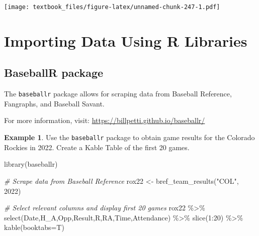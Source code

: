 \documentclass[
  11pt,
]{book}
\newenvironment{Shaded}{\begin{snugshade}}{\end{snugshade}}
\newcommand{\AttributeTok}[1]{\textcolor[rgb]{0.77,0.63,0.00}{#1}}
\newcommand{\CommentTok}[1]{\textcolor[rgb]{0.56,0.35,0.01}{\textit{#1}}}
\newcommand{\DecValTok}[1]{\textcolor[rgb]{0.00,0.00,0.81}{#1}}
\newcommand{\FunctionTok}[1]{\textcolor[rgb]{0.00,0.00,0.00}{#1}}
\newcommand{\NormalTok}[1]{#1}
\newcommand{\OtherTok}[1]{\textcolor[rgb]{0.56,0.35,0.01}{#1}}
\newcommand{\SpecialCharTok}[1]{\textcolor[rgb]{0.00,0.00,0.00}{#1}}
\newcommand{\StringTok}[1]{\textcolor[rgb]{0.31,0.60,0.02}{#1}}
\theoremstyle{definition}
\theoremstyle{definition}
\newtheorem{example}{Example}[chapter]
\theoremstyle{definition}
\theoremstyle{definition}
\theoremstyle{remark}
\begin{document}
\texttt{[image: textbook\_files/figure-latex/unnamed-chunk-247-1.pdf]}

\newpage

\hypertarget{importing-data-using-r-libraries}{%
\section{Importing Data Using R Libraries}\label{importing-data-using-r-libraries}}

\hypertarget{baseballr-package}{%
\subsection{BaseballR package}\label{baseballr-package}}

The \texttt{baseballr} package allows for scraping data from Baseball Reference, Fangraphs, and Baseball Savant.

For more information, visit: \url{https://billpetti.github.io/baseballr/}

\begin{example}
Use the \texttt{baseballr} package to obtain game results for the Colorado Rockies in 2022. Create a Kable Table of the first 20 games.
\end{example}

\begin{Shaded}
\begin{Highlighting}[]
\FunctionTok{library}\NormalTok{(baseballr)}

\CommentTok{\# Scrape data from Baseball Reference}
\NormalTok{rox22 }\OtherTok{\textless{}{-}} \FunctionTok{bref\_team\_results}\NormalTok{(}\StringTok{"COL"}\NormalTok{, }\DecValTok{2022}\NormalTok{)}

\CommentTok{\# Select relevant columns and display first 20 games}
\NormalTok{rox22 }\SpecialCharTok{\%\textgreater{}\%} 
  \FunctionTok{select}\NormalTok{(Date,H\_A,Opp,Result,R,RA,Time,Attendance) }\SpecialCharTok{\%\textgreater{}\%} 
  \FunctionTok{slice}\NormalTok{(}\DecValTok{1}\SpecialCharTok{:}\DecValTok{20}\NormalTok{) }\SpecialCharTok{\%\textgreater{}\%} \FunctionTok{kable}\NormalTok{(}\AttributeTok{booktabs=}\NormalTok{T)}
\end{Highlighting}
\end{Shaded}
\end{document}
